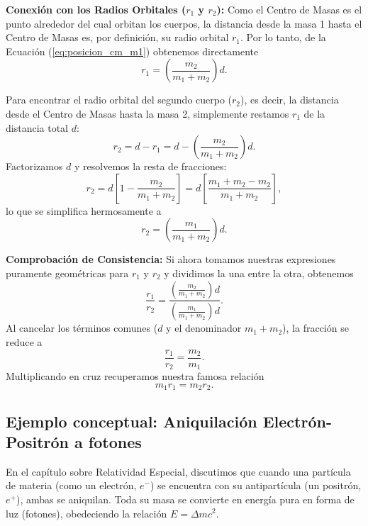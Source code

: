 \documentclass[11pt,a4paper]{book}
\begin{document}
\textbf{Conexión con los Radios Orbitales ($r_1$ y $r_2$):}
Como el Centro de Masas es el punto alrededor del cual orbitan los cuerpos, la distancia desde la masa 1 hasta el Centro de Masas es, por definición, su radio orbital $r_1$. Por lo tanto, de la Ecuación (\ref{eq:posicion_cm_m1}) obtenemos directamente
\begin{equation}
    r_1 = \left( \frac{m_2}{m_1 + m_2} \right) d.
\end{equation}

Para encontrar el radio orbital del segundo cuerpo ($r_2$), es decir, la distancia desde el Centro de Masas hasta la masa 2, simplemente restamos $r_1$ de la distancia total $d$:
\begin{equation}
    r_2 = d - r_1 = d - \left( \frac{m_2}{m_1 + m_2} \right) d.
\end{equation}
Factorizamos $d$ y resolvemos la resta de fracciones:
\begin{equation}
    r_2 = d \left[ 1 - \frac{m_2}{m_1 + m_2} \right] = d \left[ \frac{m_1 + m_2 - m_2}{m_1 + m_2} \right],
\end{equation}
lo que se simplifica hermosamente a
\begin{equation}
    r_2 = \left( \frac{m_1}{m_1 + m_2} \right) d.
\end{equation}

\textbf{Comprobación de Consistencia:}
Si ahora tomamos nuestras expresiones puramente geométricas para $r_1$ y $r_2$ y dividimos la una entre la otra, obtenemos
\begin{equation}
    \frac{r_1}{r_2} = \frac{\left( \frac{m_2}{m_1 + m_2} \right) d}{\left( \frac{m_1}{m_1 + m_2} \right) d}.
\end{equation}
Al cancelar los términos comunes ($d$ y el denominador $m_1 + m_2$), la fracción se reduce a
\begin{equation}
    \frac{r_1}{r_2} = \frac{m_2}{m_1}.
\end{equation}
Multiplicando en cruz recuperamos nuestra famosa relación
\begin{equation}
    m_1 r_1 = m_2 r_2.
\end{equation}

\subsection*{Ejemplo conceptual:  Aniquilación Electrón-Positrón a fotones}

En el capítulo sobre Relatividad Especial, discutimos que cuando una partícula de materia (como un electrón, $e^-$) se encuentra con su antipartícula (un positrón, $e^+$), ambas se aniquilan. Toda su masa se convierte en energía pura en forma de luz (fotones), obedeciendo la relación $E = \Delta m c^2$.
\end{document}

